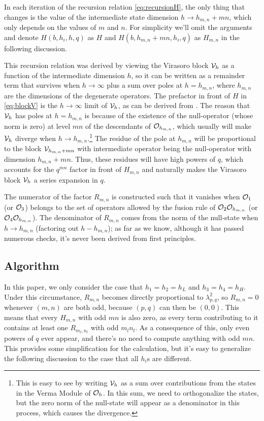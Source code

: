 \begin{subappendices}
In each iteration of the recursion relation \ref{eq:recursionH}, the only thing that changes is the value of the intermediate state dimension $h\rightarrow h_{m,n}+mn$, which only depends on the values of $m$ and $n$. For simplicity we'll omit the arguments and denote $H(b,h_i,h,q)$ as $H$ and $H(b,h_{m,n}+mn,h_i,q)$ as $H_{m,n}$ in the following discussion.

This recursion relation was derived by viewing the Virasoro block ${\cal V}_h$ as a function of the intermediate dimension $h$, so it can be written as a remainder term that survives when $h\rightarrow \infty$ plus a sum over poles at $h=h_{m,n}$, where $h_{m,n}$ are the dimensions of the degenerate operators. The prefactor in front of $H$ in \ref{eq:blockV} is the $h\rightarrow \infty$ limit of ${\cal V}_h$, as can be derived from \cite{ZamolodchikovRecursion, Zamolodchikovq, Zamolodchikov:1986gh}. The reason that ${\cal V}_h$ has poles at $h=h_{m,n}$ is because of the existence of the null-operator (whose norm is zero) at level $mn$ of the descendants of ${\cal O}_{h_{m,n}}$, which usually will make ${\cal V}_h$ diverge when $h\rightarrow h_{m,n}$.\footnote{This is easy to see by writing ${\cal V}_h$ as a sum over contributions from the states in the Verma Module of ${\cal O}_h$. In this sum, we need to orthogonalize the states, but the zero norm of the null-state will appear as a denominator in this process, which causes the divergence.} The residue of the pole at $h_{m,n}$ will be proportional to the block ${\cal V}_{h_{m,n}+mn}$ with  intermediate operator being the null-operator with dimension $h_{m,n}+mn$. Thus, these residues will have high powers of $q$, which accounts for the $q^{mn}$ factor in front of $H_{m,n}$ and naturally makes the Virasoro block ${\cal V}_h$ a series expansion in $q$.  
   
The numerator of the factor $R_{m,n}$ is constructed such that it vanishes when ${\cal O}_{1}$ (or ${\cal O}_{3}$) belongs to the set of operators allowed by the fusion rule of ${\cal O}_2{\cal O}_{h_{m,n}}$ (or ${\cal O}_4{\cal O}_{h_{m,n}}$). The denominator of $R_{m,n}$ comes from the norm of the null-state when $h\rightarrow h_{m,n}$ (factoring out $h-h_{m,n}$); as far as we know, although it has passed numerous checks, it's never been derived from first principles. 
 
\subsection{Algorithm}
In this paper, we only consider the case that $h_1 = h_2 =h_L$ and $h_3 = h_4 = h_H$. Under this circumstance, $R_{m,n}$ becomes directly proportional to $\lambda_{p,q}^2$, so $R_{m,n} = 0$ whenever $(m,n)$ are both odd, because $(p,q)$ can then be $(0,0)$. This means that every $H_{m,n}$ with odd $mn$ is also zero, as every term contributing to it contains at least one $R_{m_l,n_l}$ with odd $m_ln_l$. As a consequence of this, only even powers of $q$ ever appear, and there's no need to compute anything with odd $mn$. This provides some simplification for the calculation, but it's easy to generalize the following discussion to the case that all $h_i$s are different.


\end{subappendices}
